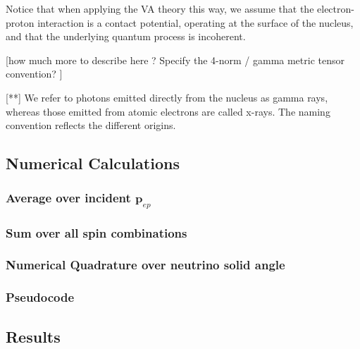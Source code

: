 \documentclass[11pt]{amsart}
\begin{document}
Notice that when applying the VA theory this way, we assume that the electron-proton interaction is a contact potential, operating at the surface of the nucleus, and that the underlying quantum process is incoherent.  

[how much more to describe here ?  Specify the 4-norm / gamma metric tensor convention? ]

[**] We refer to photons emitted directly from the nucleus as gamma rays, whereas those emitted from atomic electrons are called x-rays.    The naming convention reflects the different origins.

\subsection{Numerical Calculations}

\subsubsection{Average over incident $\mathbf{p}_{ep}$}

\subsubsection{Sum over all spin combinations}

\subsubsection{Numerical Quadrature over neutrino solid angle}

\subsubsection{Pseudocode}


\subsection{Results}
\end{document}
